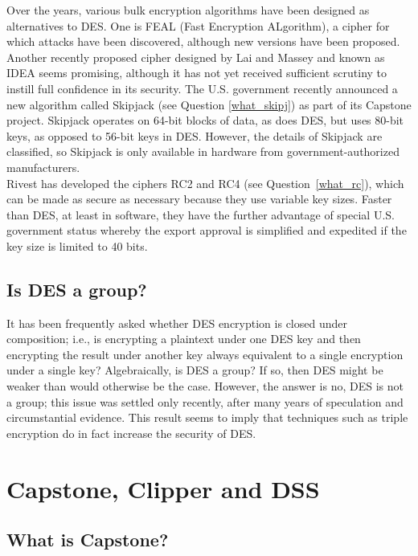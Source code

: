 Over the years, various bulk encryption algorithms have been designed as
alternatives to DES. One is FEAL (Fast Encryption ALgorithm), a cipher for
which attacks have been discovered, although new versions have been
proposed. Another recently proposed cipher designed by Lai and Massey and
known as IDEA seems promising, although it has not yet received sufficient
scrutiny to instill full confidence in its security. The U.S. government
recently announced a new algorithm called Skipjack (see Question
\ref{what_skipj}) as part of its Capstone project. Skipjack operates on
64-bit blocks of data, as does DES, but uses 80-bit keys, as opposed to
56-bit keys in DES. However, the details of Skipjack are classified, so
Skipjack is only available in hardware from government-authorized
manufacturers.\\

Rivest has developed the ciphers RC2 and RC4 (see Question~\ref{what_rc}),
which can be made as secure as necessary because they use variable key
sizes.  Faster than DES, at least in software, they have the further
advantage of special U.S. government status whereby the export approval is
simplified and expedited if the key size is limited to 40 bits.

\subsection{Is DES a group?}

It has been frequently asked whether DES encryption is closed under
composition; i.e., is encrypting a plaintext under one DES key and then
encrypting the result under another key always equivalent to a single
encryption under a single key? Algebraically, is DES a group? If so,
then DES might be weaker than would otherwise be the case. However, the
answer is no, DES is not a group; this issue was settled only recently,
after many years of speculation and circumstantial evidence. This
result seems to imply that techniques such as triple encryption do in
fact increase the security of DES.


\section{Capstone, Clipper and DSS}

\subsection{What is Capstone?}
\label{what_caps}

